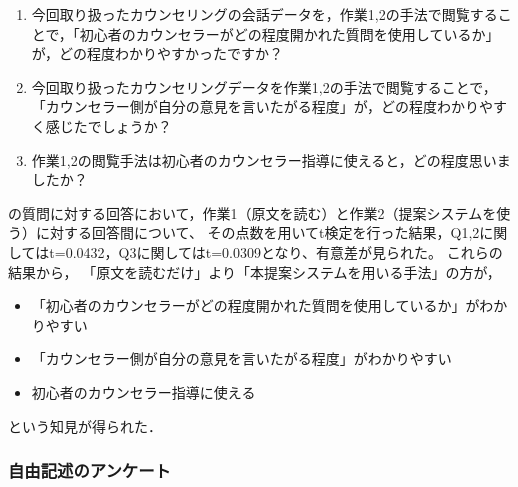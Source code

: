 \documentclass[shuuron]{kuee}
\begin{document}
\begin{enumerate}

  \item 今回取り扱ったカウンセリングの会話データを，作業1,2の手法で閲覧することで，「初心者のカウンセラーがどの程度開かれた質問を使用しているか」が，どの程度わかりやすかったですか？
  \item 今回取り扱ったカウンセリングデータを作業1,2の手法で閲覧することで，「カウンセラー側が自分の意見を言いたがる程度」が，どの程度わかりやすく感じたでしょうか？
  \item 作業1,2の閲覧手法は初心者のカウンセラー指導に使えると，どの程度思いましたか？
\end{enumerate}
の質問に対する回答において，作業1（原文を読む）と作業2（提案システムを使う）に対する回答間について、
その点数を用いてt検定を行った結果，Q1,2に関してはt=0.0432，Q3に関してはt=0.0309となり、有意差が見られた。
これらの結果から，
「原文を読むだけ」より「本提案システムを用いる手法」の方が，
\begin{itemize}
  \item 「初心者のカウンセラーがどの程度開かれた質問を使用しているか」がわかりやすい
  \item 「カウンセラー側が自分の意見を言いたがる程度」がわかりやすい
  \item 初心者のカウンセラー指導に使える
\end{itemize}
という知見が得られた．


\subsubsection{自由記述のアンケート}
%
%
%
%
%




\end{document}
